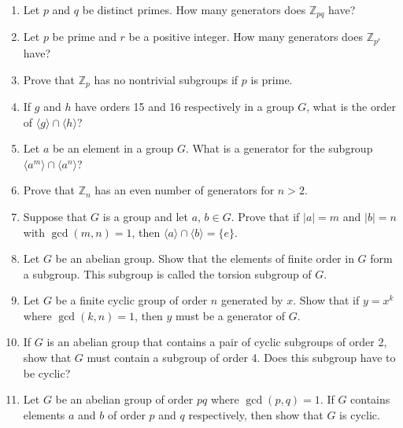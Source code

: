 {\begin{enumerate}
\begin{enumerate}
 \bf\item\rm
The order of $ab$ is the same as the order of $ba$.
 
\end{enumerate}
 
 
\bf\item\rm
Let $p$ and $q$ be distinct primes.  How many generators does ${\mathbb
Z}_{pq}$ have? 
 
 
\bf\item\rm
Let $p$ be prime and $r$ be a positive integer.  How many generators
does ${\mathbb Z}_{p^r}$ have? 
 
 
\bf\item\rm
Prove that  ${\mathbb Z}_{p}$ has no nontrivial subgroups if $p$ is
prime. 
 
 
\bf\item\rm
If $g$ and $h$ have orders 15 and 16 respectively in a group $G$, what
is the order of $\langle g \rangle  \cap \langle h \rangle $? 
 
 
\bf\item\rm
Let $a$ be an element in a group $G$. What is a generator for the
subgroup $\langle a^m \rangle  \cap  \langle a^n \rangle $?
 
 
\bf\item\rm
Prove that ${\mathbb Z}_n$ has an even number of generators for $n>2$. 
 
 
\bf\item\rm
Suppose that $G$ is a group and let $a$, $b \in G$. Prove that if $|a|
= m$ and $|b| = n$ with $\gcd(m,n) = 1$, then $\langle a \rangle  \cap
\langle b \rangle  = \{ e \}$. 
 
 
\bf\item\rm
Let $G$ be an abelian group. Show that the elements of finite order in
$G$ form a subgroup. This subgroup is called the {\bfi torsion
subgroup} of $G$. 
 
 
\bf\item\rm
Let $G$ be a finite cyclic group of order $n$ generated by $x$. Show
that if $y = x^k$ where $\gcd(k,n) = 1$, then $y$ must be a generator
of $G$.
 
 
\bf\item\rm
If $G$ is an abelian group that contains a pair of cyclic subgroups of
order 2, show that $G$ must contain a subgroup of order 4. Does this
subgroup have to be cyclic?
 
 
\bf\item\rm
Let $G$ be an abelian group of order $pq$ where $\gcd(p,q) = 1$.  If
$G$ contains elements $a$ and $b$ of order $p$ and $q$ respectively,
then show that $G$ is cyclic. 
 

\end{enumerate}}
